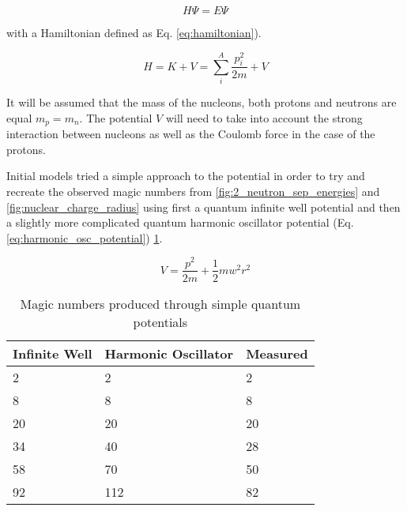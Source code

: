 \documentclass[jon_ringuette_thesis.tex]{subfiles}
\begin{document}
    \begin{equation}
        H \Psi = E \Psi
        \label{eq:schrodinger_eq_2}
    \end{equation}

    with a Hamiltonian defined as Eq. \ref{eq:hamiltonian}).

    \begin{equation}
        H = K + V = \sum^{A}_i \frac{p^2_i}{2m} + V
        \label{eq:hamiltonian}
    \end{equation}

    It will be assumed that the mass of the nucleons, both protons and neutrons are equal $m_p = m_n$.
    The potential $V$ will need to take into account the strong interaction between nucleons as well as the Coulomb force in the case of the protons.

    Initial models tried a simple approach to the potential in order to try and recreate the observed magic numbers from \ref{fig:2_neutron_sep_energies} and \ref{fig:nuclear_charge_radius} using first a quantum infinite well potential and then a slightly more complicated quantum harmonic oscillator potential (Eq.\ref{eq:harmonic_osc_potential}) \ref{tab:inf_well_harm_osc_magic_numbers}.

    \begin{equation}
        V = \frac{p^2}{2m} + \frac{1}{2} m w^2 r^2
        \label{eq:harmonic_osc_potential}
    \end{equation}


    \begin{table}
        \centering
        \caption{Magic numbers produced through simple quantum potentials}
        \label{tab:inf_well_harm_osc_magic_numbers}
        \begin{tabular}{|l|l|l|}
            \hline
            Infinite Well & Harmonic Oscillator & Measured \\
            \hline
            2             & 2                   & 2        \\
            \hline
            8             & 8                   & 8        \\
            \hline
            20            & 20                  & 20       \\
            \hline
            34            & 40                  & 28       \\
            \hline
            58            & 70                  & 50       \\
            \hline
            92            & 112                 & 82       \\
            \hline
        \end{tabular}
    \end{table}
\end{document}
